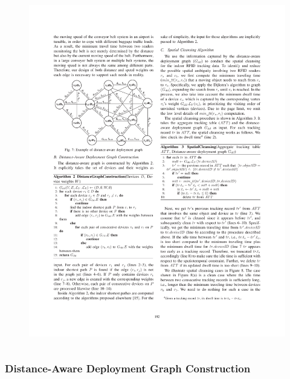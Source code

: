 \begin{frame}
\begin{columns}[c]
  \begin{figure}[tb]
    \includegraphics[width=\columnwidth]{figures/3-2/3-2-9.pdf}
  \end{figure}

\end{columns}

\end{frame}


\begin{frame}
\frametitle{Distance-Aware Deployment Graph Construction}



\end{frame}
